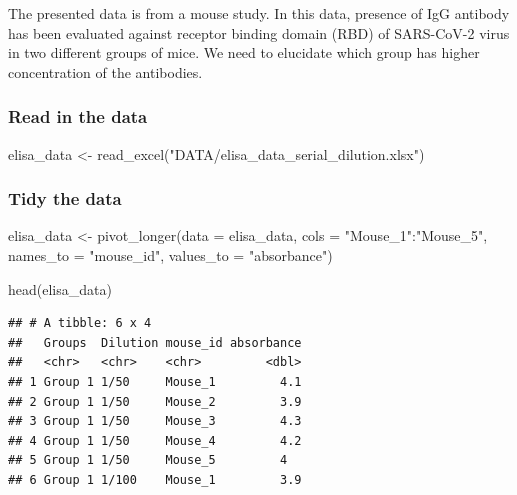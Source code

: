\documentclass[
]{book}
\newenvironment{Shaded}{\begin{snugshade}}{\end{snugshade}}
\newcommand{\AttributeTok}[1]{\textcolor[rgb]{0.77,0.63,0.00}{#1}}
\newcommand{\FunctionTok}[1]{\textcolor[rgb]{0.00,0.00,0.00}{#1}}
\newcommand{\NormalTok}[1]{#1}
\newcommand{\OtherTok}[1]{\textcolor[rgb]{0.56,0.35,0.01}{#1}}
\newcommand{\SpecialCharTok}[1]{\textcolor[rgb]{0.00,0.00,0.00}{#1}}
\newcommand{\StringTok}[1]{\textcolor[rgb]{0.31,0.60,0.02}{#1}}
\begin{document}
The presented data is from a mouse study. In this data, presence of IgG antibody has been evaluated against receptor binding domain (RBD) of SARS-CoV-2 virus in two different groups of mice. We need to elucidate which group has higher concentration of the antibodies.

\hypertarget{read-in-the-data-1}{%
\subsubsection{Read in the data}\label{read-in-the-data-1}}

\begin{Shaded}
\begin{Highlighting}[]
\NormalTok{elisa\_data }\OtherTok{\textless{}{-}} \FunctionTok{read\_excel}\NormalTok{(}\StringTok{"DATA/elisa\_data\_serial\_dilution.xlsx"}\NormalTok{)}
\end{Highlighting}
\end{Shaded}

\hypertarget{tidy-the-data}{%
\subsubsection{Tidy the data}\label{tidy-the-data}}

\begin{Shaded}
\begin{Highlighting}[]
\NormalTok{elisa\_data }\OtherTok{\textless{}{-}} \FunctionTok{pivot\_longer}\NormalTok{(}\AttributeTok{data =}\NormalTok{ elisa\_data, }
                           \AttributeTok{cols =} \StringTok{"Mouse\_1"}\SpecialCharTok{:}\StringTok{"Mouse\_5"}\NormalTok{, }
                           \AttributeTok{names\_to =} \StringTok{"mouse\_id"}\NormalTok{, }
                           \AttributeTok{values\_to =} \StringTok{"absorbance"}\NormalTok{)}

\FunctionTok{head}\NormalTok{(elisa\_data)}
\end{Highlighting}
\end{Shaded}

\begin{verbatim}
## # A tibble: 6 x 4
##   Groups  Dilution mouse_id absorbance
##   <chr>   <chr>    <chr>         <dbl>
## 1 Group 1 1/50     Mouse_1         4.1
## 2 Group 1 1/50     Mouse_2         3.9
## 3 Group 1 1/50     Mouse_3         4.3
## 4 Group 1 1/50     Mouse_4         4.2
## 5 Group 1 1/50     Mouse_5         4  
## 6 Group 1 1/100    Mouse_1         3.9
\end{verbatim}
\end{document}
